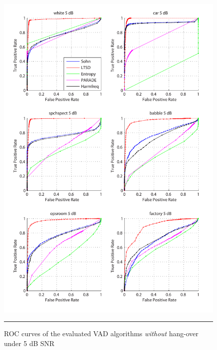 \begin{figure}[htbp]
	\centering
		\includegraphics[width=1.0\columnwidth]{Figures/Chapter4/5dBnoh.pdf}
		\rule{37em}{0.5pt}
	\caption[ROC curves of the evaluated algorithms \emph{without} hang-over under 5 dB SNR]{ROC curves of the evaluated VAD algorithms \emph{without} hang-over under 5 dB SNR}
	\label{fig:5dBnoh}
\end{figure}

